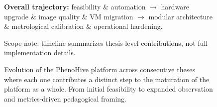 \begin{figure}[H]
\vspace{0.4em}
{\footnotesize \textbf{Overall trajectory:} feasibility \& automation $\rightarrow$ hardware upgrade \& image quality \& VM migration $\rightarrow$ modular architecture \& metrological calibration \& operational hardening.}

\vspace{0.2em}
{\footnotesize Scope note: timeline summarizes thesis-level contributions, not full implementation details.}
\caption[Evolution of the PhenoHive Platform]{Evolution of the PhenoHive platform across consecutive theses where each one contributes a distinct step to the maturation of the platform as a whole. From initial feasibility to expanded observation and metrics-driven pedagogical framing.}
\label{fig:phenohive-timeline}
\end{figure}
